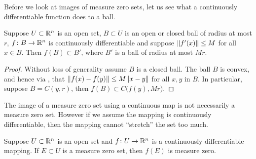 Before we look at images of measure zero sets, let us see what a
continuously differentiable function does to a ball.

\begin{lemma} \label{lemma:ballmapder}
Suppose $U \subset {\mathbb{R}}^n$ is an open set,
$B \subset U$ is an open or closed ball of radius at most $r$, $f \colon B \to {\mathbb{R}}^n$ is continuously
differentiable and suppose $\lVert {f'(x)} \rVert \leq M$ for all $x \in B$.
Then $f(B) \subset B'$, where $B'$ is a ball of radius at most $Mr$.
\end{lemma}

\begin{proof}
Without loss of generality assume $B$ is a closed ball.
The ball $B$ is convex, and hence via
,
that $\lVert {f(x)-f(y)} \rVert \leq M \lVert {x-y} \rVert$
for all $x,y$ in $B$.  In particular, suppose $B = C(y,r)$,
then $f(B) \subset C\bigl(f(y),M r \bigr)$.
\end{proof}

The image of a measure zero set using a continuous map is not necessarily
a measure zero set.  However if we assume the mapping is continuously
differentiable, then the mapping cannot ``stretch'' the set too much.

\begin{prop} \label{prop:imagenull}
Suppose $U \subset {\mathbb{R}}^n$ is an open set and $f \colon U \to {\mathbb{R}}^n$
is a continuously differentiable mapping.  If $E \subset U$ is a 
measure zero set, then $f(E)$ is measure zero.
\end{prop}

